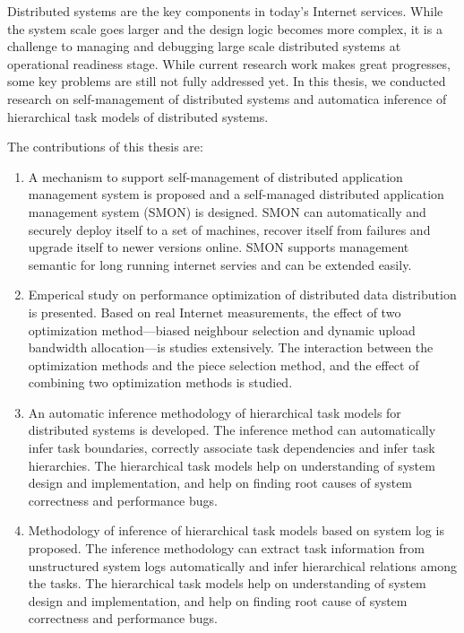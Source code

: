 
\begin{eabstract}

  Distributed systems are the key components in today's Internet
  services. While the system scale goes larger and the design logic
  becomes more complex, it is a challenge to managing and debugging
  large scale distributed systems at operational readiness stage.
  While current research work makes great progresses, some key
  problems are still not fully addressed yet. In this thesis, we
  conducted research on self-management of distributed systems and
  automatica inference of hierarchical task models of distributed
  systems.

  The contributions of this thesis are:

  \begin{enumerate}

    \item A mechanism to support self-management of distributed
    application management system is proposed and a self-managed
    distributed application management system (SMON) is designed. SMON
    can automatically and securely deploy itself to a set of machines,
    recover itself from failures and upgrade itself to newer versions
    online. SMON supports management semantic for long running
    internet servies and can be extended easily.

    \item Emperical study on performance optimization of distributed
    data distribution is presented. Based on real Internet
    measurements, the effect of two optimization method---biased
    neighbour selection and dynamic upload bandwidth allocation---is
    studies extensively. The interaction between the optimization
    methods and the piece selection method, and the effect of
    combining two optimization methods is studied.

    \item An automatic inference methodology of hierarchical task
    models for distributed systems is developed. The inference method
    can automatically infer task boundaries, correctly associate task
    dependencies and infer task hierarchies.  The hierarchical task
    models help on understanding of system design and implementation,
    and help on finding root causes of system correctness and
    performance bugs.

    \item Methodology of inference of hierarchical task models based
    on system log is proposed. The inference methodology can extract
    task information from unstructured system logs automatically and
    infer hierarchical relations among the tasks. The hierarchical
    task models help on understanding of system design and
    implementation, and help on finding root cause of system
    correctness and performance bugs.

  \end{enumerate}

\end{eabstract}

